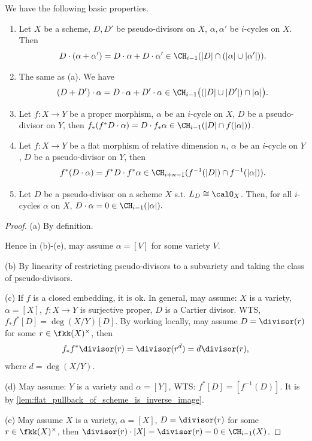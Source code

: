   \begin{proposition}\label{prop:basic_properties_of_intersection_with_pseudo-divisors}
    We have the following basic properties.
    \begin{enumerate}
      \item Let $X$ be a scheme, $D,D'$ be pseudo-divisors on $X$, $\alpha,\alpha'$ be $i$-cycles on $X$.
        Then 
        \[ D \cdot (\alpha + \alpha') = D \cdot \alpha + D \cdot \alpha' \in \CH_{i-1}(|D| \cap (|\alpha| \cup |\alpha'|)). \]

      \item The same as (a). 
        We have 
        \[ (D + D') \cdot \alpha = D \cdot \alpha + D' \cdot \alpha \in \CH_{i-1}\big((|D| \cup |D'|) \cap |\alpha|\big). \]

      \item Let $f: X \to Y$ be a proper morphism, $\alpha$ be an $i$-cycle on $X$, $D$ be a pseudo-divisor on $Y$, 
        then $f_* (f^* D \cdot \alpha) = D \cdot f_* \alpha \in \CH_{i-1}(|D| \cap f(|\alpha|))$.

      \item Let $f:X \to Y$ be a flat morphism of relative dimension $n$, $\alpha$ be an $i$-cycle on $Y$, $D$ be a pseudo-divisor on $Y$, then 
        \[ f^* (D \cdot \alpha) = f^* D \cdot f^* \alpha \in \CH_{i+n-1}(f^{-1} (|D|) \cap f^{-1}(|\alpha|)). \]

      \item Let $D$ be a pseudo-divisor on a scheme $X$ s.t. $L_D \cong \calO_X$.
        Then, for all $i$-cycles $\alpha$ on $X$, $D \cdot \alpha = 0 \in \CH_{i-1} (|\alpha|).$
    \end{enumerate} 
  \end{proposition}
  \begin{proof}
    (a) By definition.

    Hence in (b)-(e), may assume $\alpha = [V]$ for some variety $V$.

    (b) By linearity of restricting pseudo-divisors to a subvariety and taking the class of pseudo-divisors.

    (c) If $f$ is a closed embedding, it is ok.
    In general, may assume: $X$ is a variety, $\alpha = [X]$, $f:X \to Y$ is surjective proper, $D$ is a Cartier divisor.
    WTS, $f_* f^* [D] = \deg (X/Y) [D]$.
    By working locally, may assume $D = \divisor(r)$ for some $r \in \fkk (X)^\times$, then 
    \[ f_* f^* \divisor(r) = \divisor(r^d) = d \divisor(r), \]
    where $d = \deg (X/Y)$.

    (d) May assume: $Y$ is a variety and $\alpha = [Y]$, 
    WTS: $f^* [D] = [f^{-1}(D)]$.
    It is by \cref{lem:flat_pullback_of_scheme_is_inverse_image}.

    (e) May assume $X$ is a variety, $\alpha = [X]$, $D = \divisor(r)$ for some $r \in \fkk(X)^\times$, then $\divisor(r) \cdot [X] = \divisor(r) = 0 \in \CH_{i-1}(X)$.
  \end{proof}

